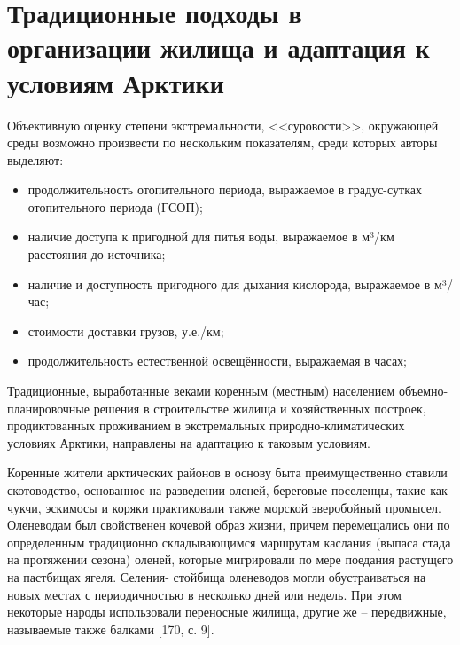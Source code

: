 \section{Традиционные подходы в организации жилища и адаптация к условиям Арктики}\label{CH01_experience_indigenous}
Объективную оценку степени экстремальности, <<суровости>>, окружающей среды возможно произвести по нескольким показателям, среди которых авторы выделяют:

\begin{itemize}
    \item продолжительность отопительного периода, выражаемое в градус-сутках отопительного периода (ГСОП);
    \item наличие доступа к пригодной для питья воды, выражаемое в м³/км расстояния до источника;
    \item наличие и доступность пригодного для дыхания кислорода, выражаемое в м³/час;
    \item стоимости доставки грузов, у.е./км;
    \item продолжительность естественной освещённости, выражаемая в часах;
\end{itemize}


Традиционные, выработанные веками коренным (местным) населением объемно-планировочные решения в строительстве жилища и хозяйственных построек,
продиктованных проживанием в экстремальных природно-климатических условиях Арктики, направлены на адаптацию к таковым условиям.

Коренные жители арктических районов в основу быта преимущественно ставили скотоводство, основанное на разведении оленей, береговые поселенцы, такие как чукчи,
эскимосы и коряки практиковали также морской зверобойный промысел. Оленеводам был свойственен кочевой образ жизни, причем перемещались они по определенным традиционно
складывающимся маршрутам каслания (выпаса стада на протяжении сезона) оленей, которые мигрировали по мере поедания растущего на пастбищах ягеля. Селения- стойбища оленеводов
могли обустраиваться на новых местах с периодичностью в несколько дней или недель. При этом некоторые народы использовали переносные жилища, другие же – передвижные, называемые также балками [170, с. 9].

